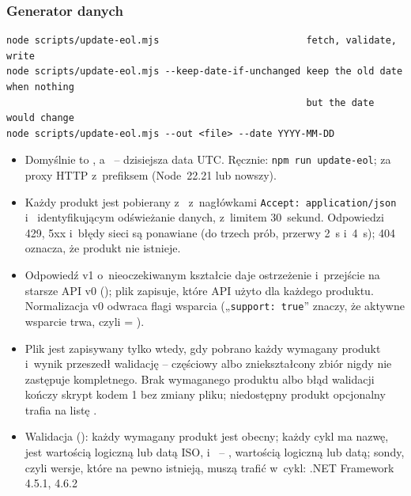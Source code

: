 \subsubsection{Generator danych}

\begin{lstlisting}
node scripts/update-eol.mjs                          fetch, validate, write
node scripts/update-eol.mjs --keep-date-if-unchanged keep the old date when nothing
                                                     but the date would change
node scripts/update-eol.mjs --out <file> --date YYYY-MM-DD
\end{lstlisting}

\begin{itemize}
  \item Domyślnie  to , a~ -- dzisiejsza
        data UTC. Ręcznie: \texttt{npm run update-eol}; za proxy HTTP z~prefiksem
         (Node~22.21 lub nowszy).
  \item Każdy produkt jest pobierany z~
        z~nagłówkami \texttt{Accept: application/json} i~
        identyfikującym odświeżanie danych, z~limitem 30~sekund. Odpowiedzi 429, 5xx i~błędy
        sieci są ponawiane (do trzech prób, przerwy 2~s i~4~s); 404 oznacza, że produkt nie
        istnieje.
  \item Odpowiedź v1 o~nieoczekiwanym kształcie daje ostrzeżenie i~przejście na starsze API v0
        (); plik zapisuje, które API użyto dla
        każdego produktu. Normalizacja v0 odwraca flagi wsparcia („\texttt{support: true}”
        znaczy, że aktywne wsparcie trwa, czyli  = ).
  \item Plik jest zapisywany tylko wtedy, gdy pobrano każdy wymagany produkt i~wynik przeszedł
        walidację -- częściowy albo zniekształcony zbiór nigdy nie zastępuje kompletnego. Brak
        wymaganego produktu albo błąd walidacji kończy skrypt kodem 1 bez zmiany pliku;
        niedostępny produkt opcjonalny trafia na listę .
  \item Walidacja (): każdy wymagany produkt jest obecny; każdy cykl
        ma nazwę,  jest wartością logiczną lub datą ISO, 
        i~ -- , wartością logiczną lub datą; sondy, czyli
        wersje, które na pewno istnieją, muszą trafić w~cykl: .NET Framework 4.5.1, 4.6.2

\end{itemize}

